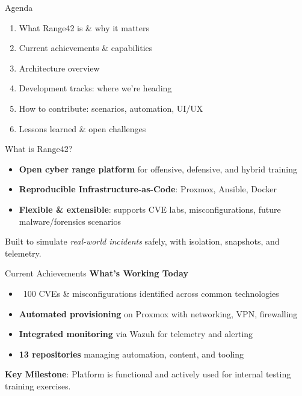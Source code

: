 \documentclass[aspectratio=169]{beamer}
\begin{document}
\begin{frame}{Agenda}
  \begin{enumerate}
    \item What Range42 is \& why it matters
    \item Current achievements \& capabilities
    \item Architecture overview
    \item Development tracks: where we're heading
    \item How to contribute: scenarios, automation, UI/UX
    \item Lessons learned \& open challenges
  \end{enumerate}
\end{frame}

\begin{frame}{What is Range42?}
  \begin{itemize}
    \item \textbf{Open cyber range platform} for offensive, defensive, and hybrid training
    \item \textbf{Reproducible Infrastructure-as-Code}: Proxmox, Ansible, Docker
    \item \textbf{Flexible \& extensible}: supports CVE labs, misconfigurations, future malware/forensics scenarios
  \end{itemize}
  \begin{tcolorbox}
    \faInfoCircle\; Built to simulate \emph{real-world incidents} safely, with isolation, snapshots, and telemetry.
  \end{tcolorbox}
\end{frame}

\begin{frame}{Current Achievements \; \faCheckCircle}
  \textbf{What's Working Today}
  \begin{itemize}
    \item \alert{~100 CVEs \& misconfigurations identified} across common technologies
    \item \textbf{Automated provisioning} on Proxmox with networking, VPN, firewalling
    \item \textbf{Integrated monitoring} via Wazuh for telemetry and alerting
    \item \textbf{13 repositories} managing automation, content, and tooling
  \end{itemize}
  \vspace{2mm}
  \begin{tcolorbox}
    \faLightbulb\; \textbf{Key Milestone}: Platform is functional and actively used for internal testing training exercises.
  \end{tcolorbox}
\end{frame}
\end{document}
